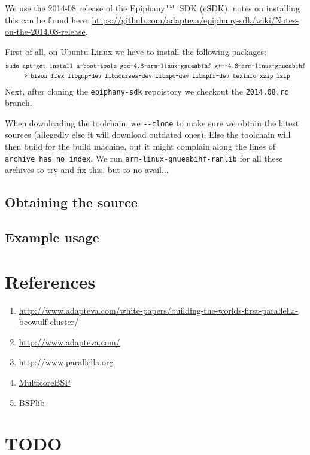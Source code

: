 \documentclass[fleqn]{article}
\renewcommand{\(}{\left(}
\renewcommand{\)}{\right)}
\def\tm{$^{\hbox{\tiny TM}}$~}
\begin{document}
We use the 2014-08 release of the Epiphany\tm SDK (eSDK), notes on installing this can be found here: \url{https://github.com/adapteva/epiphany-sdk/wiki/Notes-on-the-2014.08-release}.

First of all, on Ubuntu Linux we have to install the following packages:
\begin{align*} 
    &\texttt{sudo apt-get install u-boot-tools gcc-4.8-arm-linux-gnueabihf g++-4.8-arm-linux-gnueabihf} \\
    &\texttt{\hspace{1 cm}> bison flex libgmp-dev libncurses-dev libmpc-dev libmpfr-dev texinfo xzip lzip}
\end{align*}
Next, after cloning the \verb+epiphany-sdk+ repoistory we checkout the \texttt{2014.08.rc} branch.

When downloading the toolchain, we \verb+--clone+ to make sure we obtain the latest sources (allegedly else it will download outdated ones). Else the toolchain will then build for the build machine, but it might complain along the lines of \texttt{archive has no index}. We run \texttt{arm-linux-gnueabihf-ranlib} for all these archives to try and fix this, but to no avail...


\subsection{Obtaining the source}

\subsection{Example usage}

\section{References}

\begin{enumerate}
    \item \url{http://www.adapteva.com/white-papers/building-the-worlds-first-parallella-beowulf-cluster/}
    \item \url{http://www.adapteva.com/}
    \item \url{http://www.parallella.org}
    \item \url{MulticoreBSP}
    \item \url{BSPlib}
\end{enumerate}

\section{TODO}
\end{document}
